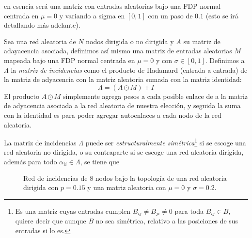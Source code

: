 en esencia será una matriz con entradas aleatorias bajo una FDP normal centrada en $\mu = 0$ y variando a sigma en $[0,1]$ con un paso de $0.1$ (esto se irá detallando más adelante). 
\begin{definición}\label{def:MatrizIncidencias}
	Sea una red aleatoria de $N$ nodos dirigida o no dirigida y $A$ su matriz de adayacencia asociada, definimos así mismo una matriz de entradas aleatorias $M$ mapeada bajo una FDP normal centrada en $\mu=0$ y con $\sigma\in[0,1]$. Definimos a $\Lambda$ la \textit{matriz de incidencias} como el producto de Hadamard (entrada a entrada) de la matriz de adyacencia con la matriz aleatoria sumada con la matriz identidad:
	\begin{equation}\label{eqn:MatrizIncidencias}
		\Lambda=(A\odot M) + I
	\end{equation}
	El producto $A\odot M$ simplemente agrega pesos a cada posible enlace de a la matriz de adyacencia asociada a la red aleatoria de nuestra elección, y seguida la suma con la identidad es para poder agregar autoenlaces a cada nodo de la red aleatoria.
\end{definición}
\setlength{\parindent}{0cm}La matriz de incidencias $\Lambda$ puede ser \textit{estructuralmente simétrica}\footnote{Es una matriz cuyas entradas cumplen $B_{ij}\neq B_{ji}\neq 0$ para toda $B_{ij}\in B$, quiere decir que aunque $B$ no sea simétrica, relativo a las posiciones de sus entradas si lo es.} si se escoge una red aleatoria no dirigida, o su contraparte si se escoge una red aleatoria dirigida, además para todo $\alpha_{ii}\in\Lambda$, se tiene que 
\begin{figure} \vspace{-30pt} \begin{center}
		 
	\end{center} 
	\vspace{-52pt} 
	\caption{Red de incidencias de 8 nodos bajo la topología de una red aleatoria dirigida con $p=0.15$ y una matriz aleatoria con $\mu=0$ y $\sigma=0.2$.} 
	\vspace{-10pt}
	\label{fig:RedIncidencias}
\end{figure} 

